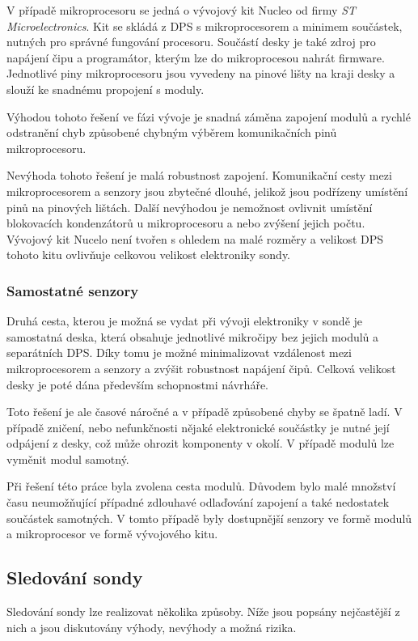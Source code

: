 \documentclass[twoside]{ctuthesis}
\theoremstyle{plain}
\theoremstyle{definition}
\theoremstyle{note}
\begin{document}
		V případě mikroprocesoru se jedná o vývojový kit Nucleo od firmy \textit{ST Microelectronics}. Kit se skládá z DPS s mikroprocesorem a minimem součástek, nutných pro správné fungování procesoru. Součástí desky je také zdroj pro napájení čipu a programátor, kterým lze do mikroprocesou nahrát firmware. Jednotlivé piny mikroprocesoru jsou vyvedeny na pinové lišty na kraji desky a slouží ke snadnému propojení s moduly. 

		Výhodou tohoto řešení ve fázi vývoje je snadná záměna zapojení modulů a rychlé odstranění chyb způsobené chybným výběrem komunikačních pinů mikroprocesoru.

		Nevýhoda tohoto řešení je malá robustnost zapojení. Komunikační cesty mezi mikroprocesorem a senzory jsou zbytečné dlouhé, jelikož jsou podřízeny umístění pinů na pinových lištách. Další nevýhodou je nemožnost ovlivnit umístění blokovacích kondenzátorů u mikroprocesoru a nebo zvýšení jejich počtu. Vývojový kit Nucelo není tvořen s ohledem na malé rozměry a velikost DPS tohoto kitu ovlivňuje celkovou velikost elektroniky sondy.

		\subsubsection{Samostatné senzory}
		Druhá cesta, kterou je možná se vydat při vývoji elektroniky v sondě je samostatná deska, která obsahuje jednotlivé mikročipy bez jejich modulů a separátních DPS. Díky tomu je možné minimalizovat vzdálenost mezi mikroprocesorem a senzory a zvýšit robustnost napájení čipů. Celková velikost desky je poté dána především schopnostmi návrháře. 

		Toto řešení je ale časové náročné a v případě způsobené chyby se špatně ladí. V případě zničení, nebo nefunkčnosti nějaké elektronické součástky je nutné její odpájení z desky, což může ohrozit komponenty v okolí. V případě modulů lze vyměnit modul samotný.

		Při řešení této práce byla zvolena cesta modulů. Důvodem bylo malé množství času neumožňující případné zdlouhavé odlaďování zapojení a také nedostatek součástek samotných. V tomto případě byly dostupnější senzory ve formě modulů a mikroprocesor ve formě vývojového kitu. 

		
			\subsection{Sledování sondy}
			Sledování sondy lze realizovat několika způsoby. Níže jsou popsány nejčastější z nich a jsou diskutovány výhody, nevýhody a možná rizika.
\end{document}
